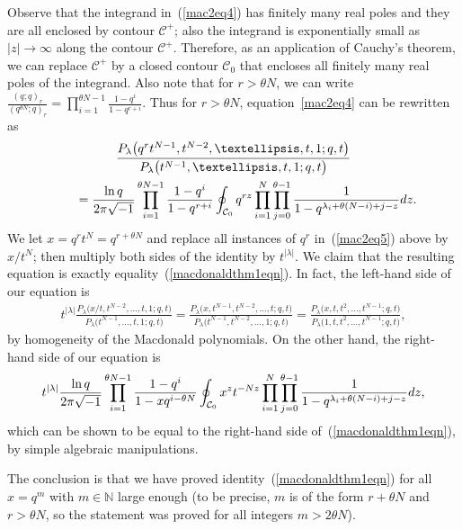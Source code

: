 \documentclass[11pt]{article}
\numberwithin{equation}{section}
\newcommand{\N}{\mathbb{N}}
\newcommand{\CC}{\mathcal{C}}
\begin{document}
Observe that the integrand in~(\ref{mac2eq4}) has f\/initely many real poles and they are all enclosed by contour $\CC^+$; also the integrand is exponentially small as $|z|\rightarrow\infty$ along the contour $\CC^+$. Therefore, as an application of Cauchy's theorem, we can replace $\CC^+$ by a closed contour $\CC_0$ that encloses all f\/initely many real poles of the integrand. Also note that for $r > \theta N$, we can write $\frac{(q; q)_r}{(q^{\theta N}; q)_r} = \prod\limits_{i=1}^{\theta N - 1}{\frac{1 - q^i}{1 - q^{r+i}}}$. Thus for $r > \theta N$, equation~\eqref{mac2eq4} can be rewritten as
\begin{gather}
\frac{P_{\lambda}\big(q^rt^{N-1}, t^{N-2}, \dots, t, 1; q, t\big)}{P_{\lambda}\big(t^{N-1}, \dots, t, 1; q, t\big)}\nonumber\\
 \qquad{} = \frac{\ln{q}}{2\pi\sqrt{-1}} \prod_{i=1}^{\theta N - 1}{\frac{1 - q^i}{1 - q^{r+i}}}\oint_{\CC_0}{q^{rz}\prod_{i=1}^N{\prod_{j=0}^{\theta - 1}{\frac{1}{1 - q^{\lambda_i + \theta(N - i) + j - z}}}{\rm d}z}}.
\label{mac2eq5}\end{gather}
We let $x = q^r t^N = q^{r + \theta N}$ and replace all instances of $q^r$ in~(\ref{mac2eq5}) above by $x/t^N$; then multiply both sides of the identity by $t^{|\lambda|}$. We claim that the resulting equation is exactly equality~(\ref{macdonaldthm1eqn}). In fact, the left-hand side of our equation is
\begin{gather*}
t^{|\lambda|}\frac{P_{\lambda}\big(x/t, t^{N-2}, \dots, t, 1; q, t\big)}{P_{\lambda}\big(t^{N-1}, \dots, t, 1; q, t\big)} = \frac{P_{\lambda}\big(x, t^{N-1}, t^{N-2}, \dots, t; q, t\big)}{P_{\lambda}\big(t^{N-1}, t^{N-2}, \dots, 1; q, t\big)} = \frac{P_{\lambda}\big(x, t, t^2, \dots, t^{N-1}; q, t\big)}{P_{\lambda}\big(1, t, t^2, \dots, t^{N-1}; q, t\big)},
\end{gather*}
by homogeneity of the Macdonald polynomials. On the other hand, the right-hand side of our equation is
\begin{gather*}
t^{|\lambda|}\frac{\ln{q}}{2\pi\sqrt{-1}} \prod_{i=1}^{\theta N - 1}{\frac{1 - q^i}{1 - xq^{i - \theta N}}}\oint_{\CC_0}{x^z t^{-Nz}\prod_{i=1}^N{\prod_{j=0}^{\theta - 1}{\frac{1}{1 - q^{\lambda_i + \theta(N - i) + j - z}}}{\rm d}z}},
\end{gather*}
which can be shown to be equal to the right-hand side of~(\ref{macdonaldthm1eqn}), by simple algebraic manipulations.

The conclusion is that we have proved identity~(\ref{macdonaldthm1eqn}) for all $x = q^m$ with $m\in\N$ large enough (to be precise, $m$ is of the form $r + \theta N$ and $r > \theta N$, so the statement was proved for all integers $m > 2\theta N$).
\end{document}
